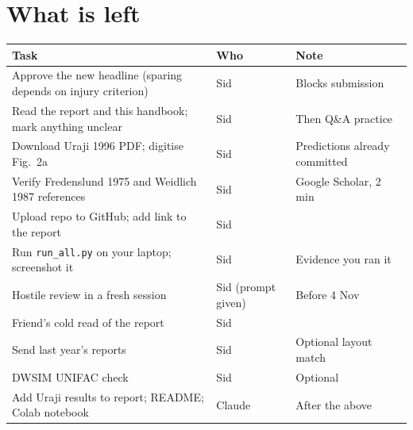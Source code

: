 \documentclass[11pt,a4paper]{article}
\newcommand{\file}[1]{\texttt{\small #1}}
\begin{document}
\section{What is left}
\begin{xltabular}{\textwidth}{@{}p{7.2cm}p{1.6cm}L@{}}
\toprule
Task & Who & Note\\
\midrule
Approve the new headline (sparing depends on injury criterion) & Sid & Blocks submission\\
Read the report and this handbook; mark anything unclear & Sid & Then Q\&A practice\\
Download Uraji 1996 PDF; digitise Fig.~2a & Sid & Predictions already committed\\
Verify Fredenslund 1975 and Weidlich 1987 references & Sid & Google Scholar, 2 min\\
Upload repo to GitHub; add link to the report & Sid & \\
Run \file{run\_all.py} on your laptop; screenshot it & Sid & Evidence you ran it\\
Hostile review in a fresh session & Sid (prompt given) & Before 4 Nov\\
Friend's cold read of the report & Sid & \\
Send last year's reports & Sid & Optional layout match\\
DWSIM UNIFAC check & Sid & Optional\\
Add Uraji results to report; README; Colab notebook & Claude & After the above\\
\bottomrule
\end{xltabular}
\end{document}
